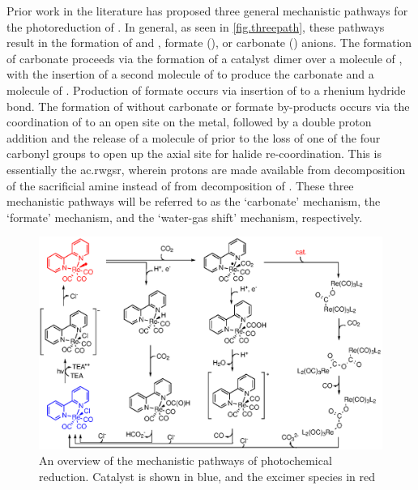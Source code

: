 Prior work in the literature has proposed three general mechanistic pathways for the photoreduction of . In general, as seen in \autoref{fig.threepath}, these pathways result in the formation of  and , formate (), or carbonate () anions. The formation of carbonate proceeds via the formation of a catalyst dimer over a molecule of , with the insertion of a second molecule of  to produce the carbonate and a molecule of . Production of formate occurs via insertion of  to a rhenium hydride bond. The formation of  without carbonate or formate by-products occurs via the coordination of  to an open site on the metal, followed by a double proton addition and the release of a molecule of  prior to the loss of one of the four carbonyl groups to open up the axial site for halide re-coordination. This is essentially the \gls{ac.rwgsr}, wherein protons are made available from decomposition of the sacrificial amine instead of from decomposition of \autocite{kalyanasundaram1978}. These three mechanistic pathways will be referred to as the `carbonate' mechanism, the `formate' mechanism, and the `water-gas shift' mechanism, respectively.

\begin{figure}[!htb]
 \begin{center}
  \includegraphics[clip=true, width=\textwidth, keepaspectratio]{images/threepaths.eps}
 \end{center}
\caption[Overview of mechanistic pathways]{An overview of the mechanistic pathways of photochemical  reduction. Catalyst is shown in blue, and the excimer species in red}
\label{fig.threepath}
\end{figure} 

